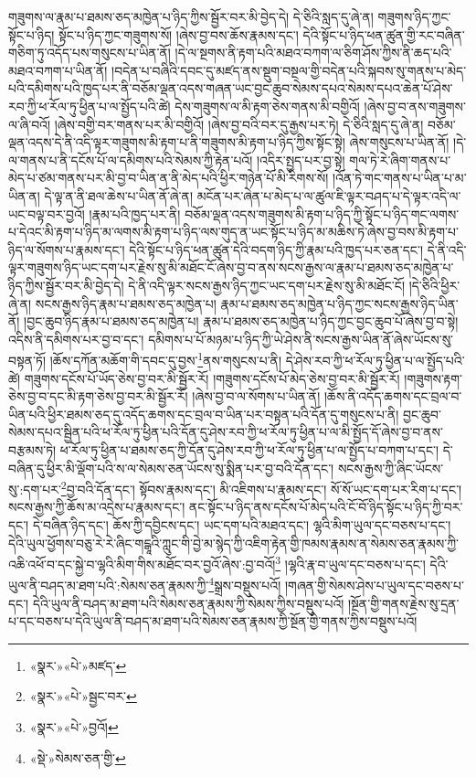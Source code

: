 གཟུགས་ལ་རྣམ་པ་ཐམས་ཅད་མཁྱེན་པ་ཉིད་ཀྱིས་སྦྱོར་བར་མི་བྱེད་དེ། དེ་ཅིའི་སླད་དུ་ཞེ་ན། གཟུགས་ཉིད་ཀྱང་སྟོང་པ་ཉིད། སྟོང་པ་ཉིད་ཀྱང་གཟུགས་སོ། །ཞེས་བྱ་བས་ཆོས་རྣམས་དང་། དེའི་སྟོང་པ་ཉིད་ཕན་ཚུན་གྱི་རང་བཞིན་གཅིག་ཏུ་འདོད་པས་གསུངས་པ་ཡིན་ནོ། །དེ་ལ་སྔགས་ནི་རྟག་པའི་མཐའ་བཀག་ལ་ཅིག་ཤོས་ཀྱིས་ནི་ཆད་པའི་མཐའ་བཀག་པ་ཡིན་ནོ། །བདེན་པ་བཞིའི་དབང་དུ་མཛད་ནས་སྡུག་བསྔལ་གྱི་བདེན་པའི་སྐབས་སུ་གནས་པ་མེད་པའི་དམིགས་པའི་ཁྱད་པར་ནི་བཅོམ་ལྡན་འདས་གཞན་ཡང་བྱང་ཆུབ་སེམས་དཔའ་སེམས་དཔའ་ཆེན་པོ་ཤེས་རབ་ཀྱི་ཕ་རོལ་ཏུ་ཕྱིན་པ་ལ་སྤྱོད་པའི་ཚེ། དེས་གཟུགས་ལ་མི་རྟག་ཅེས་གནས་མི་བགྱིའོ། །ཞེས་བྱ་བ་ནས་གཟུགས་ལ་ཞི་བའོ། །ཞེས་བགྱི་བར་གནས་པར་མི་བགྱིའོ། །ཞེས་བྱ་བའི་བར་དུ་རྒྱས་པར་ཏེ། དེ་ཅིའི་སླད་དུ་ཞེ་ན། བཅོམ་ལྡན་འདས་དེ་ནི་འདི་ལྟར་གཟུགས་མི་རྟག་པ་ནི་གཟུགས་མི་རྟག་པ་ཉིད་ཀྱིས་སྟོང་སྟེ། ཞེས་གསུངས་པ་ཡིན་ནོ། །དེ་ལ་གནས་པ་ནི་དངོས་པོ་ལ་དམིགས་པའི་སེམས་ཀྱི་རྟེན་པའོ། །འདིར་སྤྱད་པར་བྱ་སྟེ། གལ་ཏེ་རེ་ཞིག་གནས་པ་མེད་པ་ཙམ་གནས་པར་མི་བྱ་བ་ཡིན་ན་ནི་མེད་པའི་ཕྱིར་གཉེན་པོ་མི་རིགས་སོ། །འོན་ཏེ་གང་གནས་པ་ཡིན་པ་མ་ཡིན་ན། དེ་ལྟ་ན་ནི་ཐལ་ཆེས་པ་ཡིན་ནོ་ཞེ་ན། མངོན་པར་ཞེན་པ་མེད་པ་ལ་ཚུལ་ཇི་ལྟར་བཤད་པ་དེ་ལྟར་འདི་ལ་ཡང་བལྟ་བར་བྱའོ། །རྣམ་པའི་ཁྱད་པར་ནི། བཅོམ་ལྡན་འདས་གཟུགས་མི་རྟག་པ་ཉིད་ཀྱི་སྟོང་པ་ཉིད་གང་ལགས་པ་དེའང་མི་རྟག་པ་ཉིད་མ་ལགས་མི་རྟག་པ་ཉིད་ལས་གུད་ན་ཡང་སྟོང་པ་ཉིད་མ་མཆིས་ཏེ་ཞེས་བྱ་བས་མི་རྟག་པ་ཉིད་ལ་སོགས་པ་རྣམས་དང་། དེའི་སྟོང་པ་ཉིད་ཕན་ཚུན་དེའི་བདག་ཉིད་ཀྱི་རྣམ་པའི་ཁྱད་པར་ཅན་དང་། དེ་ནི་འདི་ལྟར་གཟུགས་ཉིད་ཡང་དག་པར་རྗེས་སུ་མི་མཐོང་ངོ་ཞེས་བྱ་བ་ནས་སངས་རྒྱས་ལ་རྣམ་པ་ཐམས་ཅད་མཁྱེན་པ་ཉིད་ཀྱིས་སྦྱོར་བར་མི་བྱེད་དེ། དེ་ནི་འདི་ལྟར་སངས་རྒྱས་ཉིད་ཀྱང་ཡང་དག་པར་རྗེས་སུ་མི་མཐོང་ངོ། །དེ་ཅིའི་ཕྱིར་ཞེ་ན། སངས་རྒྱས་ཉིད་རྣམ་པ་ཐམས་ཅད་མཁྱེན་པ། རྣམ་པ་ཐམས་ཅད་མཁྱེན་པ་ཉིད་ཀྱང་སངས་རྒྱས་ཉིད་ཡིན་ནོ། །བྱང་ཆུབ་ཉིད་རྣམ་པ་ཐམས་ཅད་མཁྱེན་པ། རྣམ་པ་ཐམས་ཅད་མཁྱེན་པ་ཉིད་ཀྱང་བྱང་ཆུབ་པོ་ཞེས་བྱ་བ་སྟེ། འདིས་ནི་དམིགས་པར་བྱ་བ་དང་། དམིགས་པ་པོ་མཉམ་པ་ཉིད་ཀྱི་ཡེ་ཤེས་ནི་སངས་རྒྱས་ཡིན་ནོ་ཞེས་ཡོངས་སུ་བསྟན་ཏོ། །ཆོས་དཀོན་མཆོག་གི་དབང་དུ་བྱས་\footnote{«སྣར་»«པེ་»མཛད་}ནས་གསུངས་པ་ནི། དེ་ཤེས་རབ་ཀྱི་ཕ་རོལ་ཏུ་ཕྱིན་པ་ལ་སྤྱོད་པའི་ཚེ། གཟུགས་དངོས་པོ་ཡོད་ཅེས་བྱ་བར་མི་སྦྱོར་རོ། །གཟུགས་དངོས་པོ་མེད་ཅེས་བྱ་བར་མི་སྦྱོར་རོ། །གཟུགས་རྟག་ཅེས་བྱ་བ་དང་མི་རྟག་ཅེས་བྱ་བར་མི་སྦྱོར་རོ། །ཞེས་བྱ་བ་ལ་སོགས་པ་ཡིན་ནོ། །ཆོས་ནི་འདོད་ཆགས་དང་བྲལ་བ་ཡིན་པའི་ཕྱིར་ཐམས་ཅད་དུ་འདོད་ཆགས་དང་བྲལ་བ་ཡིན་པར་བསྟན་པའི་དོན་དུ་གསུངས་པ་ནི། བྱང་ཆུབ་སེམས་དཔའ་སྦྱིན་པའི་ཕ་རོལ་ཏུ་ཕྱིན་པའི་དོན་དུ་ཤེས་རབ་ཀྱི་ཕ་རོལ་ཏུ་ཕྱིན་པ་ལ་མི་སྤྱོད་དོ་ཞེས་བྱ་བ་ནས་བརྩམས་ཏེ། ཕ་རོལ་ཏུ་ཕྱིན་པ་ཐམས་ཅད་ཀྱི་དོན་དུ་ཤེས་རབ་ཀྱི་ཕ་རོལ་ཏུ་ཕྱིན་པ་ལ་སྤྱོད་པ་བཀག་པ་དང་། དེ་བཞིན་དུ་ཕྱིར་མི་ལྡོག་པའི་ས་ལ་སེམས་ཅན་ཡོངས་སུ་སྨིན་པར་བྱ་བའི་དོན་དང་། སངས་རྒྱས་ཀྱི་ཞིང་ཡོངས་སུ་:དག་པར་\footnote{«སྣར་»«པེ་»སྦྱང་བར་}བྱ་བའི་དོན་དང་། སྟོབས་རྣམས་དང་། མི་འཇིགས་པ་རྣམས་དང་། སོ་སོ་ཡང་དག་པར་རིག་པ་དང་། སངས་རྒྱས་ཀྱི་ཆོས་མ་འདྲེས་པ་རྣམས་དང་། ནང་སྟོང་པ་ཉིད་ནས་དངོས་པོ་མེད་པའི་ངོ་བོ་ཉིད་སྟོང་པ་ཉིད་ཀྱི་བར་དང་། དེ་བཞིན་ཉིད་དང་། ཆོས་ཀྱི་དབྱིངས་དང་། ཡང་དག་པའི་མཐའ་དང་། ལྷའི་མིག་ཡུལ་དང་བཅས་པ་དང་། དེའི་ཡུལ་ཕྱོགས་བཅུ་རེ་རེ་ཞིང་གངྒཱའི་ཀླུང་གི་བྱེ་མ་སྙེད་ཀྱི་འཇིག་རྟེན་གྱི་ཁམས་རྣམས་ན་སེམས་ཅན་རྣམས་ཀྱི་འཆི་འཕོ་བ་དང་སྐྱེ་བ་ལྷའི་མིག་གིས་མཐོང་བར་བྱའོ་ཞེས་:བྱ་བའོ།\footnote{«སྣར་»«པེ་»བྱའོ།} །ལྷའི་རྣ་བ་ཡུལ་དང་བཅས་པ་དང་། དེའི་ཡུལ་ནི་བཤད་མ་ཐག་པའི་:སེམས་ཅན་རྣམས་ཀྱི་\footnote{«སྡེ་»སེམས་ཅན་གྱི་}སྒྲས་བསྡུས་པའོ། །གཞན་གྱི་སེམས་ཤེས་པ་ཡུལ་དང་བཅས་པ་དང་། དེའི་ཡུལ་ནི་བཤད་མ་ཐག་པའི་སེམས་ཅན་རྣམས་ཀྱི་སེམས་ཀྱིས་བསྡུས་པའོ། །སྔོན་གྱི་གནས་རྗེས་སུ་དྲན་པ་དང་བཅས་པ་དེའི་ཡུལ་ནི་བཤད་མ་ཐག་པའི་སེམས་ཅན་རྣམས་ཀྱི་སྔོན་གྱི་གནས་ཀྱིས་བསྡུས་པའོ། 